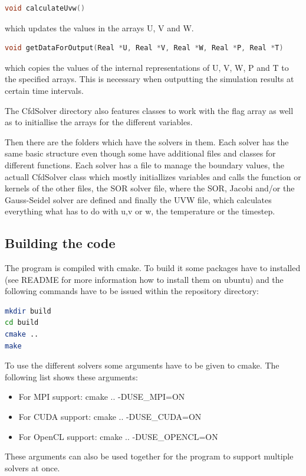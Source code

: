 \documentclass{article}%
\begin{document}
\begin{lstlisting}[language=C++,frame=single]
void calculateUvw()
\end{lstlisting}
which updates the values in the arrays U, V and W.

\begin{lstlisting}[language=C++,frame=single]
void getDataForOutput(Real *U, Real *V, Real *W, Real *P, Real *T)
\end{lstlisting}
which copies the values of the internal representations of U, V, W, P and T to the specified arrays. This is necessary when outputting the simulation results at certain time intervals.

The CfdSolver directory also features classes to work with the flag array as well as to initiallise the arrays for the different variables.

Then there are the folders which have the solvers in them. Each solver has the same basic structure even though some have additional files and classes for different functions. Each solver has a file to manage the boundary values, the actuall CfdSolver class which mostly initiallizes variables and calls the function or kernels of the other files, the SOR solver file, where the SOR, Jacobi and/or the Gauss-Seidel solver are defined and finally the UVW file, which calculates everything what has to do with u,v or w, the temperature or the timestep.

\subsection{Building the code}
The program is compiled with cmake. To build it some packages have to installed (see README for more information how to install them on ubuntu) and the following commands have to be issued within the repository directory:
\begin{lstlisting}[language=bash,frame=single]
mkdir build
cd build
cmake ..
make
\end{lstlisting}

To use the different solvers some arguments have to be given to cmake. The following list shows these arguments:
\begin{itemize}
\item For MPI support: cmake .. -DUSE\_MPI=ON
\item For CUDA support: cmake .. -DUSE\_CUDA=ON
\item For OpenCL support: cmake .. -DUSE\_OPENCL=ON
\end{itemize}
These arguments can also be used together for the program to support multiple solvers at once.
\end{document}
